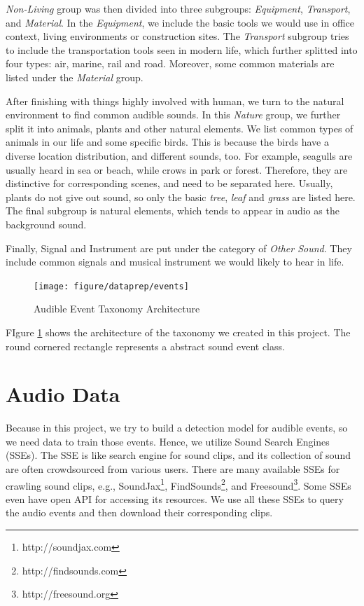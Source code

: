 \textit{Non-Living} group was then divided into three subgroups: \textit{Equipment}, \textit{Transport}, and \textit{Material}. 
In the \textit{Equipment}, we include the basic tools we would use in office context, living environments or construction sites. 
The \textit{Transport} subgroup tries to include the transportation tools seen in modern life, which further splitted into four types: air, marine, rail and road. 
Moreover, some common materials are listed under the \textit{Material} group. 

After finishing with things highly involved with human, we turn to the natural environment to find common audible sounds. 
In this \textit{Nature} group, we further split it into animals, plants and other natural elements. 
We list common types of animals in our life and some specific birds. 
This is because the birds have a diverse location distribution, and different sounds, too. 
For example, seagulls are usually heard in sea or beach, while crows in park or forest. 
Therefore, they are distinctive for corresponding scenes, and need to be separated here. 
Usually, plants do not give out sound, so only the basic \textit{tree}, \textit{leaf} and \textit{grass} are listed here. 
The final subgroup is natural elements, which tends to appear in audio as the background sound.  

Finally, Signal and Instrument are put under the category of \textit{Other Sound}. 
They include common signals and musical instrument we would likely to hear in life. 

\begin{figure}[htb]
\centering
\texttt{[image: figure/dataprep/events]}
\caption{Audible Event Taxonomy Architecture}
\label{fig:events}
\end{figure}

FIgure \ref{fig:events} shows the architecture of the taxonomy we created in this project. 
The round cornered rectangle represents a abstract sound event class.  

\section{Audio Data}
Because in this project, we try to build a detection model for audible events, so we need data to train those events. 
Hence, we utilize Sound Search Engines (SSEs). 
The SSE is like search engine for sound clips, and its collection of sound are often crowdsourced from various users. 
There are many available SSEs for crawling sound clips, e.g., SoundJax\footnote{http://soundjax.com}, FindSounds\footnote{http://findsounds.com}, and Freesound\footnote{http://freesound.org}. 
Some SSEs even have open API for accessing its resources. 
We use all these SSEs to query the audio events and then download their corresponding clips. 

